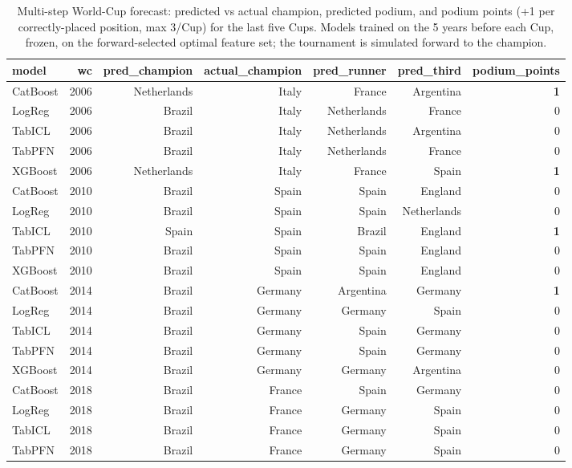 \begin{table}[t]
  \centering
  \caption{Multi-step World-Cup forecast: predicted vs actual champion, predicted podium, and podium points (+1 per correctly-placed position, max 3/Cup) for the last five Cups. Models trained on the 5 years before each Cup, frozen, on the forward-selected optimal feature set; the tournament is simulated forward to the champion.}
  \label{tab:worldcup_multistep}
  \begin{tabular}{lrrrrrr}
  \toprule
  model & wc & pred\_champion & actual\_champion & pred\_runner & pred\_third & podium\_points \\
  \midrule
  CatBoost & 2006 & Netherlands & Italy & France & Argentina & \textbf{1} \\
  LogReg & 2006 & Brazil & Italy & Netherlands & France & 0 \\
  TabICL & 2006 & Brazil & Italy & Netherlands & Argentina & 0 \\
  TabPFN & 2006 & Brazil & Italy & Netherlands & France & 0 \\
  XGBoost & 2006 & Netherlands & Italy & France & Spain & \textbf{1} \\
  CatBoost & 2010 & Brazil & Spain & Spain & England & 0 \\
  LogReg & 2010 & Brazil & Spain & Spain & Netherlands & 0 \\
  TabICL & 2010 & Spain & Spain & Brazil & England & \textbf{1} \\
  TabPFN & 2010 & Brazil & Spain & Spain & England & 0 \\
  XGBoost & 2010 & Brazil & Spain & Spain & England & 0 \\
  CatBoost & 2014 & Brazil & Germany & Argentina & Germany & \textbf{1} \\
  LogReg & 2014 & Brazil & Germany & Germany & Spain & 0 \\
  TabICL & 2014 & Brazil & Germany & Spain & Germany & 0 \\
  TabPFN & 2014 & Brazil & Germany & Spain & Germany & 0 \\
  XGBoost & 2014 & Brazil & Germany & Germany & Argentina & 0 \\
  CatBoost & 2018 & Brazil & France & Spain & Germany & 0 \\
  LogReg & 2018 & Brazil & France & Germany & Spain & 0 \\
  TabICL & 2018 & Brazil & France & Germany & Spain & 0 \\
  TabPFN & 2018 & Brazil & France & Germany & Spain & 0 \\

\end{tabular}
\end{table}
